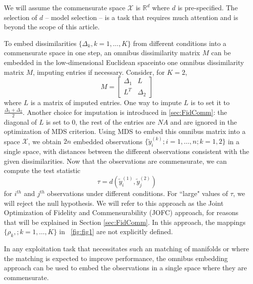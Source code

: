 \documentclass[11pt]{article} %
\begin{document}
We will assume  the commensurate space  $\mathcal{X}$  is  $\mathbb{R}^d$ where $d$ is pre-specified. The selection of $d$ -- model selection -- is  a task that requires much attention and is  beyond the scope of this article.






To embed dissimilarities  $\{\Delta_k,k=1 ,\ldots,K\}$  from different conditions into a commensurate space in one step, an omnibus dissimilarity matrix  $M$ can be embedded in the low-dimensional Euclidean spaceinto one omnibus dissimilarity matrix $M$, imputing entries if necessary. Consider, for $K=2$, \begin{equation}
M=  \left[ \begin{array}{cc}
         \Delta_1 & L\\
        L^T  & \Delta_2 
     \end{array}  \right]     \label{omnibus} 
\end{equation} where $L$ is a matrix of imputed entries. One way to impute $L$ is to set it to $\frac{\Delta_1+\Delta_2}{2}$. Another choice for imputation is introduced in \ref{sec:FidComm}: the diagonal of $L$ is set to 0, the rest of the entries are $NA$ and are ignored in the optimization of MDS criterion.  
Using MDS to embed  this omnibus matrix into a  space  $\mathcal{X}$, we obtain $2n$ embedded observations $\{\tilde{y}_i^{(k)}; i=1,\ldots,n;k=1,2\}$ in a single space, with distances between the different observations consistent with the given dissimilarities. Now that the observations are commensurate, we can compute the test statistic \[
\tau=d\left(\tilde{y}_i^{(1)},\tilde{y}_j^{(2)}\right)\label{teststat}
\] for $i^{th}$ and $j^{th}$ observations under different conditions.  For ``large" values of $\tau$, we will reject the null hypothesis. We will refer to this approach as the Joint Optimization of Fidelity and Commensurability (JOFC) approach, for reasons that will be explained in Section \ref{sec:FidComm}. In this approach, the mappings   $\{ \rho_k,; k=1,\ldots,K\}$ in ~\ref{fig:fig1}  are not explicitly defined.


In any exploitation task that necessitates such an matching of manifolds or where the matching is expected to  improve performance, the omnibus embedding approach can be used  to embed the observations in a single space where they are commensurate. 
\end{document}

